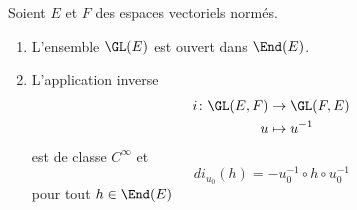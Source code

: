 \begin{theorem}    \label{ThoCINVBTJ}
    Soient \( E\) et \( F\) des espaces vectoriels normés.
    \begin{enumerate}
        \item
        L'ensemble \( \GL(E)\) est ouvert dans \( \End(E)\).
    \item
        L'application inverse
    \begin{equation}
        \begin{aligned}
        i\colon \GL(E,F)&\to \GL(F,E) \\
        u&\mapsto u^{-1}
        \end{aligned}
    \end{equation}
    est de classe \( C^{\infty}\) et
    \begin{equation}
        di_{u_0}(h)=-u_0^{-1}\circ h\circ u_0^{-1}
    \end{equation}
    pour tout \( h\in\End(E)\)
    \end{enumerate}
\end{theorem}

